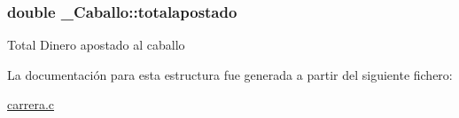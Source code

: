 \subsubsection[{\texorpdfstring{totalapostado}{totalapostado}}]{\setlength{\rightskip}{0pt plus 5cm}double \+\_\+\+Caballo\+::totalapostado}\hypertarget{struct__Caballo_ac18791b370ba0dfbf8bb29554e701cb3}{}\label{struct__Caballo_ac18791b370ba0dfbf8bb29554e701cb3}
Total Dinero apostado al caballo 

La documentación para esta estructura fue generada a partir del siguiente fichero\+:\begin{DoxyCompactItemize}
\item 
\hyperlink{carrera_8c}{carrera.\+c}\end{DoxyCompactItemize}
